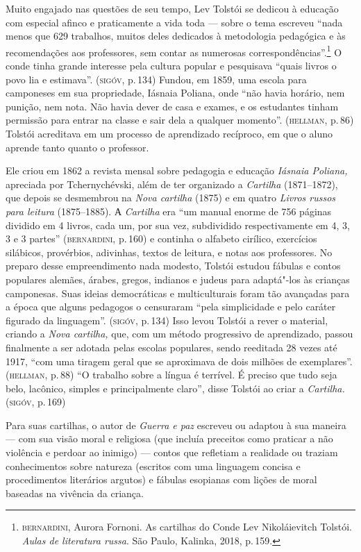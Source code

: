 Muito engajado nas questões de seu tempo, Lev Tolstói se dedicou à
educação com especial afinco e praticamente a vida toda --- sobre o tema
escreveu ``nada menos que 629 trabalhos, muitos deles dedicados à
metodologia pedagógica e às recomendações aos professores, sem contar as
numerosas correspondências''.\footnote{\textsc{bernardini}, Aurora Fornoni. As
  cartilhas do Conde Lev Nikoláievitch Tolstói. \emph{Aulas de
  literatura russa}. São Paulo, Kalinka, 2018, p.\,159.} O conde
tinha grande interesse pela cultura popular e pesquisava ``quais livros
o povo lia e estimava''. (\textsc{sigóv}, p.\,134) Fundou, em 1859, uma escola
para camponeses em sua propriedade, Iásnaia Poliana, onde ``não
havia horário, nem punição, nem nota. Não havia dever de casa e exames,
e os estudantes tinham permissão para entrar na classe e sair dela a
qualquer momento''. (\textsc{hellman}, p.\,86) Tolstói acreditava em um processo
de aprendizado recíproco, em que o aluno aprende tanto quanto o
professor.

Ele criou em 1862 a revista mensal sobre pedagogia e educação
\emph{Iásnaia Poliana,} apreciada por Tchernychévski, além de ter
organizado a \emph{Cartilha} (1871--1872), que depois se desmembrou na
\emph{Nova cartilha} (1875) e em quatro \emph{Livros russos para
leitura} (1875--1885). А \emph{Cartilha} era ``um manual enorme
de 756 páginas dividido em 4 livros, cada um, por sua vez, subdividido
respectivamente em 4, 3, 3 e 3 partes'' (\textsc{bernardini}, p.\,160) e continha
o alfabeto cirílico, exercícios silábicos, provérbios, adivinhas, textos
de leitura, e notas aos professores. No preparo desse empreendimento
nada modesto, Tolstói estudou fábulas e contos populares alemães,
árabes, gregos, indianos e judeus para adaptá"-los às crianças
camponesas. Suas ideias democráticas e multiculturais foram tão
avançadas para a época que alguns pedagogos o censuraram ``pela
simplicidade e pelo caráter figurado da linguagem''. (\textsc{sigóv}, p.\,134)
Isso levou Tolstói a rever o material, criando a \emph{Nova cartilha,}
que, com um método progressivo de aprendizado, passou finalmente a ser
adotada pelas escolas populares, sendo reeditada 28 vezes até 1917,
``com uma tiragem geral que se aproximava de dois milhões de
exemplares''. (\textsc{hellman}, p.\,88) ``O trabalho sobre a língua é terrível. É
preciso que tudo seja belo, lacônico, simples e principalmente claro'',
disse Tolstói ao criar a \emph{Cartilha.} (\textsc{sigóv}, p.\,169)

Para suas cartilhas, o autor de \emph{Guerra e paz} escreveu ou adaptou
à sua maneira --- com sua visão moral e religiosa (que incluía preceitos
como praticar a não violência e perdoar ao inimigo) --- contos que
refletiam a realidade ou traziam conhecimentos sobre natureza (escritos
com uma linguagem concisa e procedimentos literários argutos) e fábulas
esopianas com lições de moral baseadas na vivência da criança.

